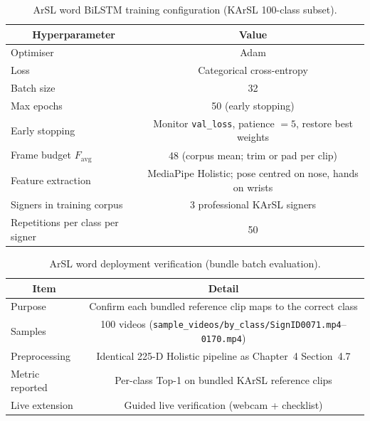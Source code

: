 \begin{table}[H]
\centering
\caption{ArSL word BiLSTM training configuration (KArSL 100-class subset).}
\label{tab:ch5-arsl-train}
\small
\begin{tabular}{|l|c|}
\hline
\multicolumn{1}{|c|}{\textbf{Hyperparameter}} & \multicolumn{1}{|c|}{\textbf{Value}}\\
\hline
Optimiser & Adam \\
\hline
Loss & Categorical cross-entropy \\
\hline
Batch size & 32 \\
\hline
Max epochs & 50 (early stopping) \\
\hline
Early stopping & Monitor \texttt{val\_loss}, patience $=5$, restore best weights \\
\hline
Frame budget $F_{\mathrm{avg}}$ & 48 (corpus mean; trim or pad per clip) \\
\hline
Feature extraction & MediaPipe Holistic; pose centred on nose, hands on wrists \\
\hline
Signers in training corpus & 3 professional KArSL signers \\
\hline
Repetitions per class per signer & 50 \\
\hline
\end{tabular}
\end{table}
\vspace{0.3cm}

\begin{table}[H]
\centering
\caption{ArSL word deployment verification (bundle batch evaluation).}
\label{tab:ch5-arsl-bundle}
\small
\begin{tabular}{|l|c|}
\hline
\multicolumn{1}{|c|}{\textbf{Item}} & \multicolumn{1}{|c|}{\textbf{Detail}}\\
\hline
Purpose & Confirm each bundled reference clip maps to the correct class \\
\hline
Samples & 100 videos (\texttt{sample\_videos/by\_class/SignID0071.mp4}--\texttt{0170.mp4}) \\
\hline
Preprocessing & Identical 225-D Holistic pipeline as Chapter~4 Section~4.7 \\
\hline
Metric reported & Per-class Top-1 on bundled KArSL reference clips \\
\hline
Live extension & Guided live verification (webcam + checklist) \\
\hline
\end{tabular}
\end{table}
\vspace{0.2cm}


